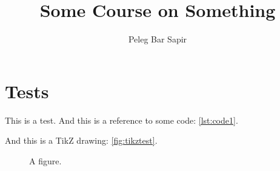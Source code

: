 \documentclass{article}
\title{Some Course on Something}
\author{Peleg Bar Sapir}
\begin{document}
\maketitle

\ifdefined\testcode
  \section{Tests}
  This is a test. And this is a reference to some code: \autoref{lst:code1}.
  

  And this is a TikZ drawing: \autoref{fig:tikztest}.

  \begin{figure}
      \begin{center}
      \end{center}
    \caption{A figure.}\label{fig:tikztest}
  \end{figure}
  
\else
\fi






\end{document}
